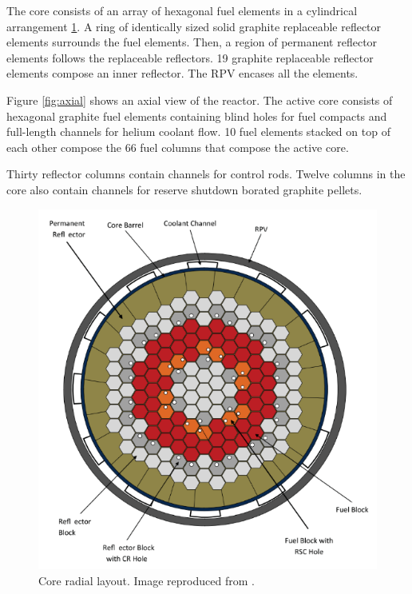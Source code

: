 \documentclass{anstrans}
\begin{document}
The core consists of an array of hexagonal fuel elements in a cylindrical arrangement \ref{fig:radial}.
A ring of identically sized solid graphite replaceable reflector elements surrounds the fuel elements.
Then, a region of permanent reflector elements follows the replaceable reflectors.
19 graphite replaceable reflector elements compose an inner reflector.
The RPV encases all the elements.

Figure \ref{fig:axial} shows an axial view of the reactor.
The active core consists of hexagonal graphite fuel elements containing blind holes for fuel compacts and full-length channels for helium coolant flow.
10 fuel elements stacked on top of each other compose the 66 fuel columns that compose the active core.

Thirty reflector columns contain channels for control rods.
Twelve columns in the core also contain channels for reserve shutdown borated graphite pellets.

\begin{figure}[htbp!] %
	\centering
	\includegraphics[width=0.95\linewidth]{figures/radial-layout.png}
	\hfill
	\caption{Core radial layout. Image reproduced from \cite{oecd_nea_benchmark_2017}.}
	\label{fig:radial}
\end{figure}
\end{document}
